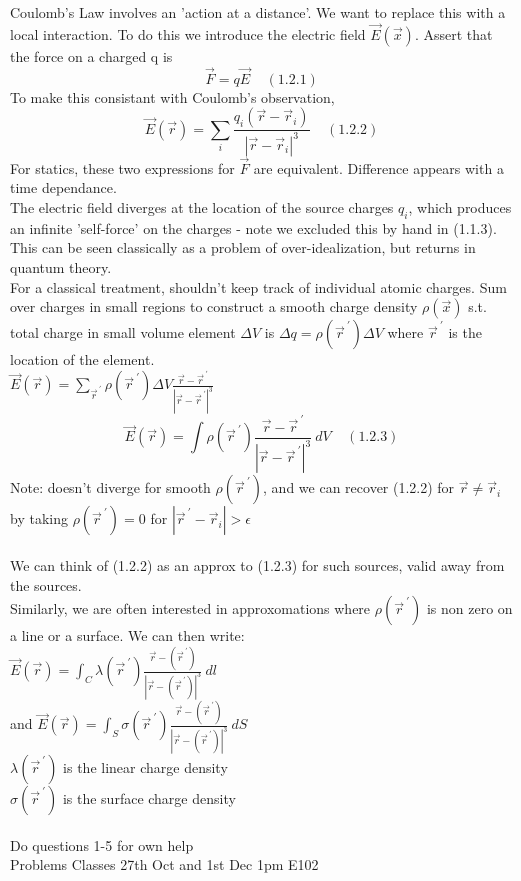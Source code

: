 \documentclass[a4paper,11pt]{article}
\begin{document}
Coulomb's Law involves an 'action at a distance'. We want to replace this with a local interaction. To do this we introduce the electric field $\vec{E}(\vec{x})$.
Assert that the force on a charged q is $$\vec{F} = q\vec{E} ~~~~~(1.2.1)$$
To make this consistant with Coulomb's observation,
$$\vec{E}(\vec{r}) = \sum_i \frac{q_i (\vec{r} - \vec{r}_i)}{|\vec{r} - \vec{r}_i|^3} ~~~~~(1.2.2)$$
For statics, these two expressions for $\vec{F}$ are equivalent. Difference appears with a time dependance.\\
The electric field diverges at the location of the source charges $q_i$, which produces an infinite 'self-force' on the charges - note we excluded this by hand in (1.1.3). This can be seen classically as a problem of over-idealization, but returns in quantum theory.\\
For a classical treatment, shouldn't keep track of individual atomic charges. Sum over charges in small regions to construct a smooth charge density $\rho (\vec{x})$ s.t. total charge in small volume element $\Delta V$ is $\Delta q = \rho (\vec{r}^{~'})\Delta V$ where $\vec{r}^{~'}$ is the location of the element.\\
$\vec{E}(\vec{r}) = \sum _{\vec{r}^{~'}} \rho (\vec{r}^{~'}) \Delta V \frac{\vec{r} - \vec{r}^{~'}}{|\vec{r} - \vec{r}^{~'}|^3}$\\
$$\vec{E}(\vec{r}) = \int \rho (\vec{r}^{~'}) \frac{\vec{r} - \vec{r}^{~'}}{|\vec{r} - \vec{r}^{~'}|^3}~dV ~~~~~ (1.2.3)$$
Note: doesn't diverge for smooth $\rho (\vec{r}^{~'})$, and we can recover (1.2.2) for $\vec{r} \neq \vec{r}_i$ by taking $\rho (\vec{r}^{~'}) = 0$ for $|\vec{r}^{~'} - \vec{r}_i| > \epsilon$\\
\\
We can think of (1.2.2) as an approx to (1.2.3) for such sources, valid away from the sources.\\
Similarly, we are often interested in approxomations where $\rho (\vec{r}^{~'})$ is non zero on a line or a surface. We can then write:\\
$\vec{E}(\vec{r}) = \int_C \lambda (\vec{r}^{~'}) \frac{\vec{r} - (\vec{r}^{~'})}{|\vec{r} - (\vec{r}^{~'})|^3} ~dl$\\
and $\vec{E}(\vec{r}) = \int_S \sigma (\vec{r}^{~'}) \frac{\vec{r} - (\vec{r}^{~'})}{|\vec{r} - (\vec{r}^{~'})|^3} ~dS$\\
$\lambda (\vec{r}^{~'})$ is the linear charge density\\
$\sigma (\vec{r}^{~'})$ is the surface charge density\\
\\
Do questions 1-5 for own help\\
Problems Classes 27th Oct and 1st Dec 1pm E102
\end{document}
